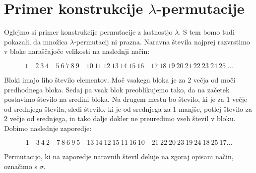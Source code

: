 \documentclass[12pt,a4paper,reqno]{amsart}
\theoremstyle{definition} %
\theoremstyle{plain} %
\begin{document}
\section{Primer konstrukcije $\lambda$-permutacije} \label{sec:konstrukcija}

Oglejmo si primer konstrukcije permutacije z lastnostjo $\lambda$. S tem bomo tudi pokazali, da množica $\lambda$-permutacij ni prazna.
Naravna števila najprej razvrstimo v bloke naraščajoče velikosti na naslednji način:

\begin{equation}
1 \quad 2\: 3\: 4 \quad 5\: 6\: 7\: 8\: 9 \quad 10\: 11\: 12\: 13\: 14\: 15\: 16 \quad 17\: 18\: 19\: 20\: 21\: 22\: 23\: 24\: 25\: \ldots 
\label{eq:1}
\end{equation}

Bloki imajo liho število elementov. Moč vsakega bloka je za $2$ večja od moči predhodnega bloka. Sedaj pa vsak blok preoblikujemo tako, da na začetek postavimo število na sredini bloka. Na drugem mestu bo število, ki je za $1$ večje od srednjega števila, sledi število, ki je od srednjega za $1$ manjše, potlej število za $2$ večje od srednjega, in tako dalje dokler ne preuredimo vseh števil v bloku. Dobimo naslednje zaporedje:

\begin{equation}  
1 \quad 3\: 4\: 2 \quad 7\: 8\: 6\: 9\: 5 \quad 13\: 14\: 12\: 15\: 11\: 16\: 10 \quad 21\: 22\: 20\: 23\: 19\: 24\: 18\: 25\: 17 \ldots 
\label{eq:2}
\end{equation}

Permutacijo, ki na zaporedje naravnih števil deluje na zgoraj opisani način, označimo s $\sigma$. 
\end{document}
